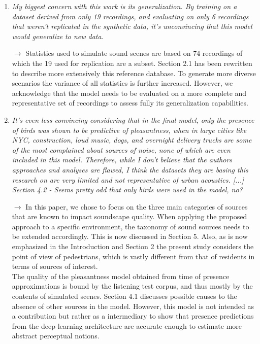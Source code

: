 \documentclass[10pt]{article}
\begin{document}
\begin{enumerate}

\item \emph{My biggest concern with this work is its generalization. By training on a dataset derived from only 19 recordings, and evaluating on only 6 recordings that weren't replicated in the synthetic data, it's unconvincing that this model would generalize to new data.}

$\rightarrow$ Statistics used to simulate sound scenes are based on 74 recordings of which the 19 used for replication are a subset. Section 2.1 has been rewritten to describe more extensively this reference database. To generate more diverse scenarios the variance of all statistics is further increased. However, we acknowledge that the model needs to be evaluated on a more complete and representative set of recordings to assess fully its generalization capabilities.

\item \emph{It's even less convincing considering that in the final model, only the presence of birds was shown to be predictive of pleasantness, when in large cities like NYC, construction, loud music, dogs, and overnight delivery trucks are some of the most complained about sources of noise, none of which are even included in this model. Therefore, while I don't believe that the authors approaches and analyses are flawed, I think the datasets they are basing this research on are very limited and not representative of urban acoustics. [...]\\
Section 4.2 - Seems pretty odd that only birds were used in the model, no?}

$\rightarrow$ In this paper, we chose to focus on the three main categories of sources that are known to impact soundscape quality. When applying the proposed approach to a specific environment, the taxonomy of sound sources needs to be extended accordingly. This is now discussed in Section 5. Also, as is now emphasized in the Introduction and Section 2 the present study considers the point of view of pedestrians, which is vastly different from that of residents in terms of sources of interest.\\
The quality of the pleasantness model obtained from time of presence approximations is bound by the listening test corpus, and thus mostly by the contents of simulated scenes. Section 4.1 discusses possible causes to the absence of other sources in the model. However, this model is not intended as a contribution but rather as a intermediary to show that presence predictions from the deep learning architecture are accurate enough to estimate more abstract perceptual notions.


\end{enumerate}
\end{document}
